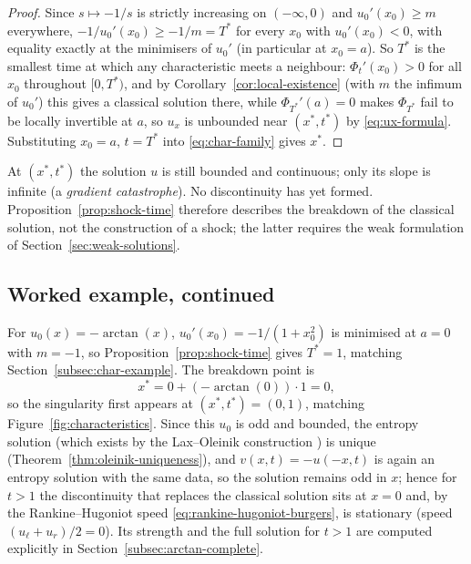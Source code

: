 \begin{proof}
Since $s \mapsto -1/s$ is strictly increasing on $(-\infty,0)$ and
$u_0'(x_0) \geq m$ everywhere, $-1/u_0'(x_0) \geq -1/m = T^*$ for every
$x_0$ with $u_0'(x_0)<0$, with equality exactly at the minimisers of
$u_0'$ (in particular at $x_0=a$). So $T^*$ is the smallest time at which
any characteristic meets a neighbour: $\Phi_t'(x_0)>0$ for all $x_0$
throughout $[0,T^*)$, and by Corollary~\ref{cor:local-existence} (with
$m$ the infimum of $u_0'$) this gives a classical solution there, while
$\Phi_{T^*}'(a)=0$ makes $\Phi_{T^*}$ fail to be locally invertible at
$a$, so $u_x$ is unbounded near $(x^*,t^*)$ by \eqref{eq:ux-formula}.
Substituting $x_0=a$, $t=T^*$ into \eqref{eq:char-family} gives $x^*$.
\end{proof}

\begin{remark}
\label{rem:singularity-vs-shock}
At $(x^*,t^*)$ the solution $u$ is still bounded and continuous; only its
slope is infinite (a \emph{gradient catastrophe}). No discontinuity has yet
formed. Proposition~\ref{prop:shock-time} therefore describes the
breakdown of the classical solution, not the construction of a shock; the
latter requires the weak formulation of Section~\ref{sec:weak-solutions}.
\end{remark}

\subsection{Worked example, continued}
\label{subsec:shock-example}

For $u_0(x) = -\arctan(x)$, $u_0'(x_0) = -1/(1+x_0^2)$ is minimised at
$a=0$ with $m=-1$, so Proposition~\ref{prop:shock-time} gives $T^*=1$,
matching Section~\ref{subsec:char-example}. The breakdown point is
\begin{equation}
  x^* = 0 + (-\arctan(0))\cdot 1 = 0,
\end{equation}
so the singularity first appears at $(x^*,t^*) = (0,1)$, matching
Figure~\ref{fig:characteristics}. Since this $u_0$ is odd and bounded, the entropy solution (which exists
by the Lax--Oleinik construction \cite[\S3.4.2]{evans2010}) is unique
(Theorem~\ref{thm:oleinik-uniqueness}), and $v(x,t)=-u(-x,t)$ is again an
entropy solution with the same data, so the solution remains odd in $x$; hence for $t>1$ the discontinuity that
replaces the classical solution sits at $x=0$ and, by the
Rankine--Hugoniot speed \eqref{eq:rankine-hugoniot-burgers}, is stationary
(speed $(u_\ell+u_r)/2=0$). Its strength and the full solution for $t>1$
are computed explicitly in Section~\ref{subsec:arctan-complete}.

